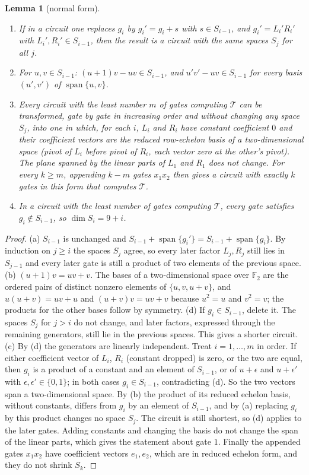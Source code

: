 \documentclass[11pt,a4paper]{article}
\newtheorem{lemma}[theorem]{Lemma}
\theoremstyle{definition}
\newcommand{\F}{\mathbb{F}}
\newcommand{\Tg}{\mathcal{T}}
\newcommand{\spn}{\operatorname{span}}
\begin{document}
\begin{lemma}[normal form]\label{lem:normal}
\begin{enumerate}
\item[(a)] If in a circuit one replaces $g_i$ by $g_i'=g_i+s$ with $s\in S_{i-1}$, and $g_i'=L_i'R_i'$ with $L_i',R_i'\in S_{i-1}$, then the result is a circuit with the same spaces $S_j$ for all $j$.
\item[(b)] For $u,v\in S_{i-1}$: $(u+1)v-uv\in S_{i-1}$, and $u'v'-uv\in S_{i-1}$ for every basis $(u',v')$ of $\spn\{u,v\}$.
\item[(c)] Every circuit with the least number $m$ of gates computing $\Tg$ can be transformed, gate by gate in increasing order and without changing any space $S_j$, into one in which, for each $i$, $L_i$ and $R_i$ have constant coefficient $0$ and their coefficient vectors are the reduced row-echelon basis of a two-dimensional space (pivot of $L_i$ before pivot of $R_i$, each vector zero at the other's pivot). The plane spanned by the linear parts of $L_1$ and $R_1$ does not change. For every $k\ge m$, appending $k-m$ gates $x_1x_2$ then gives a circuit with exactly $k$ gates in this form that computes $\Tg$.
\item[(d)] In a circuit with the least number of gates computing $\Tg$, every gate satisfies $g_i\notin S_{i-1}$, so $\dim S_i=9+i$.
\end{enumerate}
\end{lemma}

\begin{proof}
(a) $S_{i-1}$ is unchanged and $S_{i-1}+\spn\{g_i'\}=S_{i-1}+\spn\{g_i\}$. By induction on $j\ge i$ the spaces $S_j$ agree, so every later factor $L_j,R_j$ still lies in $S_{j-1}$ and every later gate is still a product of two elements of the previous space.
(b) $(u+1)v=uv+v$. The bases of a two-dimensional space over $\F_2$ are the ordered pairs of distinct nonzero elements of $\{u,v,u+v\}$, and $u(u+v)=uv+u$ and $(u+v)v=uv+v$ because $u^2=u$ and $v^2=v$; the products for the other bases follow by symmetry.
(d) If $g_i\in S_{i-1}$, delete it. The spaces $S_j$ for $j>i$ do not change, and later factors, expressed through the remaining generators, still lie in the previous spaces. This gives a shorter circuit.
(c) By (d) the generators are linearly independent. Treat $i=1,\dots,m$ in order. If either coefficient vector of $L_i$, $R_i$ (constant dropped) is zero, or the two are equal, then $g_i$ is a product of a constant and an element of $S_{i-1}$, or of $u+\epsilon$ and $u+\epsilon'$ with $\epsilon,\epsilon'\in\{0,1\}$; in both cases $g_i\in S_{i-1}$, contradicting (d). So the two vectors span a two-dimensional space. By (b) the product of its reduced echelon basis, without constants, differs from $g_i$ by an element of $S_{i-1}$, and by (a) replacing $g_i$ by this product changes no space $S_j$. The circuit is still shortest, so (d) applies to the later gates. Adding constants and changing the basis do not change the span of the linear parts, which gives the statement about gate $1$. Finally the appended gates $x_1x_2$ have coefficient vectors $e_1,e_2$, which are in reduced echelon form, and they do not shrink $S_k$.
\end{proof}
\end{document}
